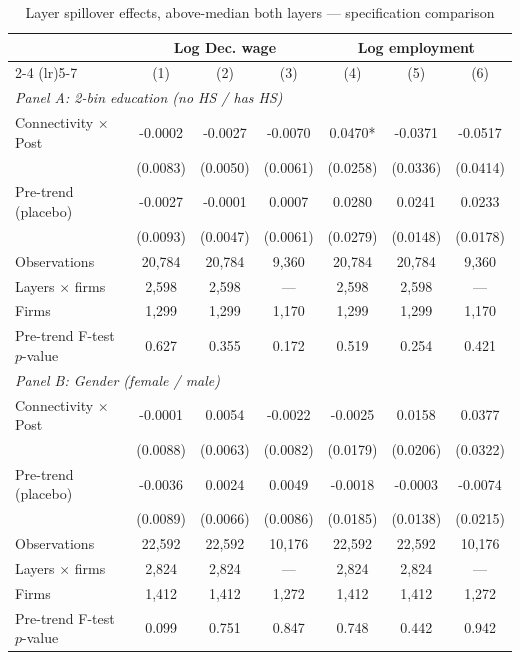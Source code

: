 \begin{table}[H]
\centering
\caption{Layer spillover effects, above-median both layers --- specification comparison}
\label{tab:layer_specs_abvmed}
\scriptsize
\begin{threeparttable}
\begin{tabular}{lcccccc}
\toprule\toprule
 & \multicolumn{3}{c}{Log Dec. wage} & \multicolumn{3}{c}{Log employment} \\
\cmidrule(lr){2-4} \cmidrule(lr){5-7}
 & (1) & (2) & (3) & (4) & (5) & (6) \\
\midrule
\multicolumn{7}{l}{\textit{Panel A: 2-bin education (no HS / has HS)}} \\
\quad Connectivity $\times$ Post & -0.0002 & -0.0027 & -0.0070 & 0.0470* & -0.0371 & -0.0517 \\
 & (0.0083) & (0.0050) & (0.0061) & (0.0258) & (0.0336) & (0.0414) \\
\quad Pre-trend (placebo) & -0.0027 & -0.0001 & 0.0007 & 0.0280 & 0.0241 & 0.0233 \\
 & (0.0093) & (0.0047) & (0.0061) & (0.0279) & (0.0148) & (0.0178) \\
\quad Observations & 20,784 & 20,784 & 9,360 & 20,784 & 20,784 & 9,360 \\
\quad Layers $\times$ firms & 2,598 & 2,598 & --- & 2,598 & 2,598 & --- \\
\quad Firms & 1,299 & 1,299 & 1,170 & 1,299 & 1,299 & 1,170 \\
\quad Pre-trend F-test $p$-value & 0.627 & 0.355 & 0.172 & 0.519 & 0.254 & 0.421 \\[6pt]
\multicolumn{7}{l}{\textit{Panel B: Gender (female / male)}} \\
\quad Connectivity $\times$ Post & -0.0001 & 0.0054 & -0.0022 & -0.0025 & 0.0158 & 0.0377 \\
 & (0.0088) & (0.0063) & (0.0082) & (0.0179) & (0.0206) & (0.0322) \\
\quad Pre-trend (placebo) & -0.0036 & 0.0024 & 0.0049 & -0.0018 & -0.0003 & -0.0074 \\
 & (0.0089) & (0.0066) & (0.0086) & (0.0185) & (0.0138) & (0.0215) \\
\quad Observations & 22,592 & 22,592 & 10,176 & 22,592 & 22,592 & 10,176 \\
\quad Layers $\times$ firms & 2,824 & 2,824 & --- & 2,824 & 2,824 & --- \\
\quad Firms & 1,412 & 1,412 & 1,272 & 1,412 & 1,412 & 1,272 \\
\quad Pre-trend F-test $p$-value & 0.099 & 0.751 & 0.847 & 0.748 & 0.442 & 0.942 \\[6pt]

\end{tabular}
\end{threeparttable}
\end{table}
